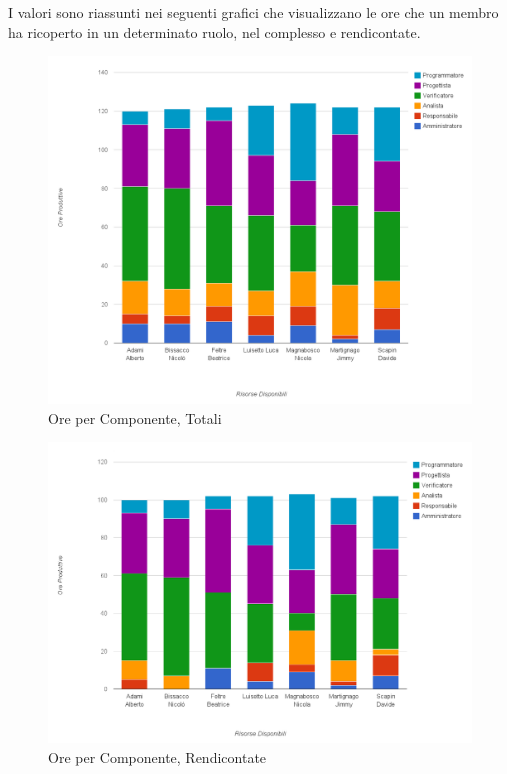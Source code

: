 I valori sono riassunti nei seguenti grafici che visualizzano le ore che un membro ha ricoperto in un determinato ruolo, nel complesso e rendicontate.
\begin{figure}[!h]
	\centering
	\includegraphics[width=\linewidth]{./content/Immagini/prospetti/costiRisTot.png}
	\caption{Ore per Componente, Totali}
\end{figure}
\begin{figure}[!h]
	\centering
	\includegraphics[width=\linewidth]{./content/Immagini/prospetti/oreRisorseRem.png}
	\caption{Ore per Componente, Rendicontate}
\end{figure}


